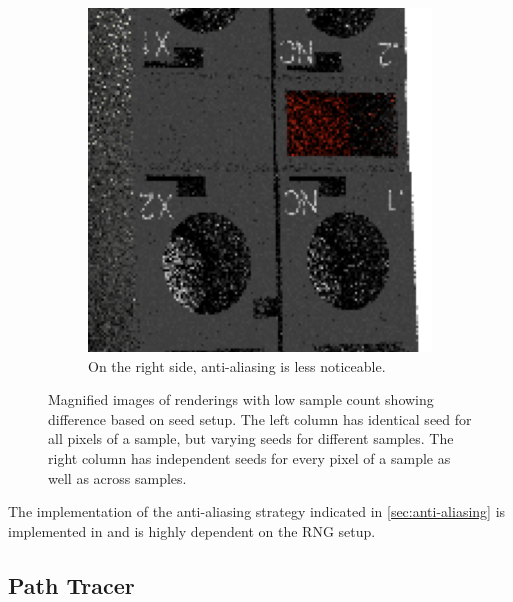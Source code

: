 \begin{figure}[H]
\begin{subfigure}[t]{0.3\textwidth}
        \includegraphics[width=\textwidth]{resources/good-seed-anti-aliasing.png}
        \caption{On the right side, anti-aliasing is less noticeable.}
        \label{fig:rngNoiseArtifactsHighlightsGoodAnti}
    \end{subfigure}
    \hspace*{2cm}
    \caption{Magnified images of renderings with low sample count showing difference based on seed setup. The left column has identical seed for all pixels of a sample, but varying seeds for different samples. The right column has independent seeds for every pixel of a sample as well as across samples.}
    \label{fig:rngNoiseArtifactsHighlights}
\end{figure}

\label{sec:anti-aliasing-implementation}
The implementation of the anti-aliasing strategy indicated in \ref{sec:anti-aliasing} is implemented in  and is highly dependent on the \gls{RNG} setup.

\subsection*{Path Tracer}

